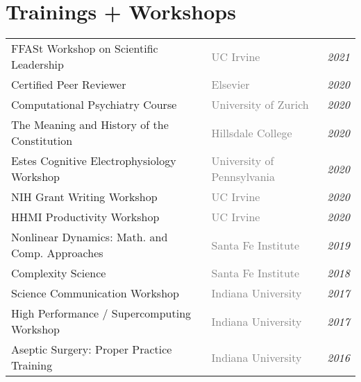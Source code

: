 \documentclass[10pt]{cooperCV2}
\begin{document}

\section{Trainings + Workshops}

\begin{longtable}{@{} l l @{\extracolsep{\fill}}  l @{}} 
	 
	FFASt Workshop on Scientific Leadership & \textcolor{gray}{UC Irvine}  & \textit{2021} \\
	 
	Certified Peer Reviewer & \textcolor{gray}{Elsevier}  & \textit{2020} \\
	 
	Computational Psychiatry Course & \textcolor{gray}{University of Zurich}  & \textit{2020} \\
	 
	The Meaning and History of the Constitution & \textcolor{gray}{Hillsdale College}  & \textit{2020} \\
	 
	Estes Cognitive Electrophysiology Workshop & \textcolor{gray}{University of Pennsylvania}  & \textit{2020} \\
	 
	NIH Grant Writing Workshop & \textcolor{gray}{UC Irvine}  & \textit{2020} \\
	 
	HHMI Productivity Workshop & \textcolor{gray}{UC Irvine}  & \textit{2020} \\
	 
	Nonlinear Dynamics: Math. and Comp. Approaches & \textcolor{gray}{Santa Fe Institute}  & \textit{2019} \\
	 
	Complexity Science & \textcolor{gray}{Santa Fe Institute}  & \textit{2018} \\
	 
	Science Communication Workshop & \textcolor{gray}{Indiana University}  & \textit{2017} \\
	 
	High Performance / Supercomputing Workshop & \textcolor{gray}{Indiana University}  & \textit{2017} \\
	 
	Aseptic Surgery: Proper Practice Training & \textcolor{gray}{Indiana University}  & \textit{2016} \\
	 

\end{longtable}
\end{document}

